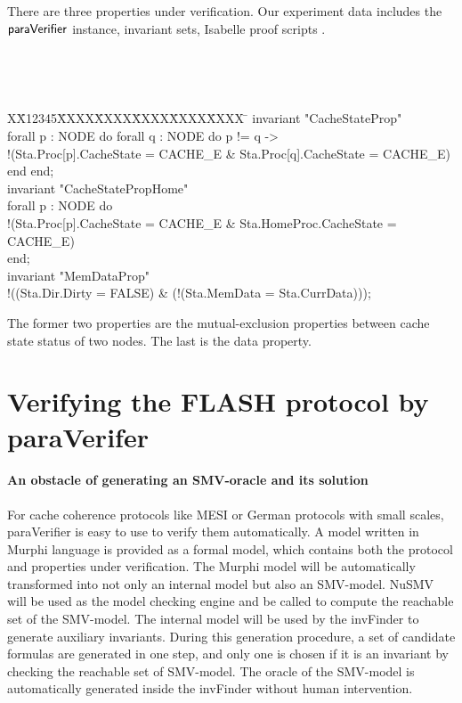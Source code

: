 \documentclass{llncs-new}
\newlength{\fminilength}
\newenvironment{fmini}[1][\linewidth]
  {\setlength{\fminilength}{#1\fboxsep-2\fboxrule}%
   \vspace{2ex}\noindent\begin{lrbox}{\fminibox}\begin{minipage}{\fminilength}%
   \mbox{ }\hfill\vspace{-2.5ex}}%
  {\end{minipage}\end{lrbox}\vspace{1ex}\hspace{0ex}%
   \framebox{\usebox{\fminibox}}}
\newenvironment{specification}
{\noindent\scriptsize
\tt\begin{fmini}\begin{tabbing}X\=X12345\=XXXX\=XXXX\=XXXX\=XXXX\=XXXX
\=\+\kill} {\end{tabbing}\normalfont\end{fmini}}
\newcommand{\bedt}[1]{{\color{black}#1}}
\begin{document}
There are three properties under verification.  Our experiment data includes the
${\sf paraVerifier}$ instance, invariant sets, Isabelle proof
scripts \cite{LiCache16a}.

\begin{specification}
invariant "CacheStateProp"\\
  forall p : NODE do forall q : NODE do     p != q ->\\
    !(Sta.Proc[p].CacheState = CACHE\_E \& Sta.Proc[q].CacheState = CACHE\_E)\\
  end end;\\

invariant "CacheStatePropHome"\\
  forall p : NODE do\\
    !(Sta.Proc[p].CacheState = CACHE\_E \& Sta.HomeProc.CacheState = CACHE\_E)\\
  end;\\

invariant "MemDataProp"\\
  !((Sta.Dir.Dirty = FALSE) \& (!(Sta.MemData = Sta.CurrData)));
\end{specification}

The former two properties are the mutual-exclusion properties between  cache state status of two nodes. The last is the  data property.
\vspace{-5pt}
\section{Verifying the FLASH protocol by {\sf paraVerifer} \label{sec:experiments}}
\vspace{-5pt}
\paragraph{An obstacle of generating an SMV-oracle and its solution}
For cache coherence protocols like MESI or German protocols with small scales,   {\sf paraVerifier}  is easy to use to verify them automatically. \bedt{A model written in Murphi language} is provided as a formal model, which contains both the protocol and properties under verification. The Murphi model will be automatically transformed into not only an internal model but also an SMV-model. NuSMV will \bedt{be used as the model checking engine} and be called to compute the reachable set of the SMV-model. The internal model will be used by the {\sf invFinder} to generate auxiliary invariants. During this generation procedure, a set of candidate  formulas are generated in one step, and only one is chosen  if it is an invariant by checking the reachable set of   SMV-model. The oracle of the SMV-model is automatically generated inside the {\sf invFinder} without human intervention.
\end{document}
